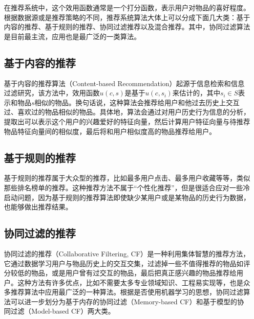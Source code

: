   在推荐系统中，这个效用函数通常是一个打分函数，表示用户对物品的喜好程度。
  根据数据源或是推荐策略的不同，推荐系统算法大体上可以分成下面几大类：基于内容的推荐、基于规则的推荐、协同过滤推荐以及混合推荐。其中，协同过滤算法是目前最主流，应用也是最广泛的一类算法。
    \subsection{基于内容的推荐}
    基于内容的推荐算法（Content-based Recommendation）起源于信息检索和信息过滤研究，该方法中，效用函数$u(c,s)$是基于$u(c,s_i)$来估计的，其中$s_i\in S$表示和物品$s$相似的物品。换句话说，这种算法会推荐给用户和他过去历史上交互过、喜欢过的物品相似的物品。具体地，算法会通过对用户历史行为信息的分析，提取出可以表示这个用户的兴趣爱好的特征向量，然后计算用户特征向量与待推荐物品特征向量间的相似度，最后将和用户相似度高的物品推荐给用户\cite{lops2011content}。

    \subsection{基于规则的推荐}
    基于规则的推荐属于大众型的推荐，比如最多用户点击、最多用户收藏等等，类似那些排名榜单的推荐。这种推荐方法不属于“个性化推荐”，但是很适合应对一些冷启动问题，因为基于规则的推荐算法即使缺少某用户或是某物品的历史行为数据，也能够做出推荐结果。

    \subsection{协同过滤的推荐}
    协同过滤的推荐（Collaborative Filtering, CF）是一种利用集体智慧的推荐方法，它通过数据学习用户与物品历史上的交互交集，过滤掉一些不值得推荐的物品如评分较低的物品，或是用户曾有过交互的物品，最后把真正感兴趣的物品推荐给用户。这种方法有许多优点，比如不需要太多专业领域知识、工程易实现等，也是众多推荐算法中应用最广泛的一种算法。根据是否使用机器学习的思想，协同过滤算法可以进一步划分为基于内存的协同过滤（Memory-based CF）和基于模型的协同过滤（Model-based CF）\cite{su2009survey}两大类。
